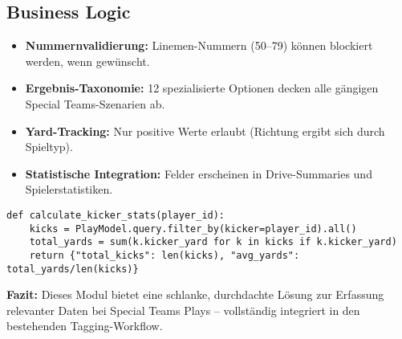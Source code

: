 \subsection{Business Logic}

\begin{itemize}
  \item \textbf{Nummernvalidierung:} Linemen-Nummern (50–79) können blockiert werden, wenn gewünscht.
  \item \textbf{Ergebnis-Taxonomie:} 12 spezialisierte Optionen decken alle gängigen Special Teams-Szenarien ab.
  \item \textbf{Yard-Tracking:} Nur positive Werte erlaubt (Richtung ergibt sich durch Spieltyp).
  \item \textbf{Statistische Integration:} Felder erscheinen in Drive-Summaries und Spielerstatistiken.
\end{itemize}

\begin{verbatim}
def calculate_kicker_stats(player_id):
    kicks = PlayModel.query.filter_by(kicker=player_id).all()
    total_yards = sum(k.kicker_yard for k in kicks if k.kicker_yard)
    return {"total_kicks": len(kicks), "avg_yards": total_yards/len(kicks)}
\end{verbatim}

\textbf{Fazit:} Dieses Modul bietet eine schlanke, durchdachte Lösung zur Erfassung relevanter Daten bei Special Teams Plays – vollständig integriert in den bestehenden Tagging-Workflow.


